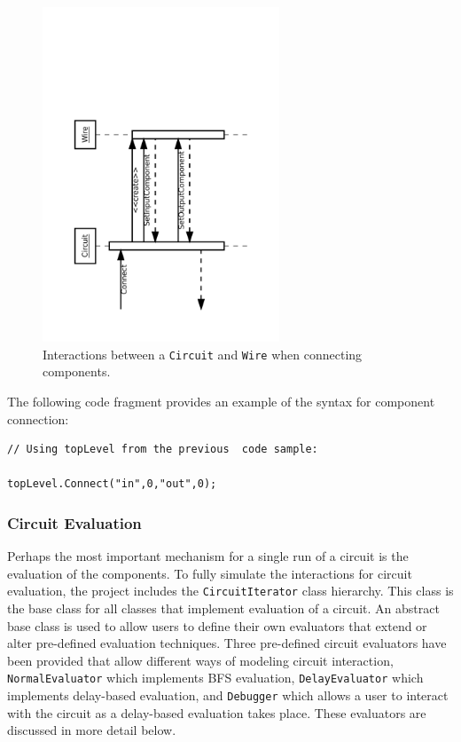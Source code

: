 \documentclass{article}
\newcommand{\ClassName}[1]{\texttt{#1}}
\begin{document}
\begin{figure}[H]
    \begin{center}
        \includegraphics[angle=270,width=200pt]{imgs/ComponentConnectionInteraction.pdf}
    \end{center}
    \caption{Interactions between a \ClassName{Circuit} and \ClassName{Wire} when connecting components.}
\end{figure}

The following code fragment provides an example of the syntax for component connection:

\begin{lstlisting}
// Using topLevel from the previous  code sample:

topLevel.Connect("in",0,"out",0);
\end{lstlisting}

\subsubsection{Circuit Evaluation}

Perhaps the most important mechanism for a single run of a circuit is the evaluation of the components. To fully simulate the interactions for circuit evaluation, the project includes the \ClassName{CircuitIterator} class hierarchy. This class is the base class for all classes that implement evaluation of a circuit.  An abstract base class is used to allow users to define their own evaluators that extend or alter pre-defined evaluation techniques. Three pre-defined circuit evaluators have been provided that allow different ways of modeling circuit interaction, \ClassName{NormalEvaluator} which implements BFS evaluation, \ClassName{DelayEvaluator} which implements delay-based evaluation, and \ClassName{Debugger}
 which allows a user to interact with the circuit as a delay-based evaluation takes place. These evaluators are discussed in more detail below.
\end{document}
